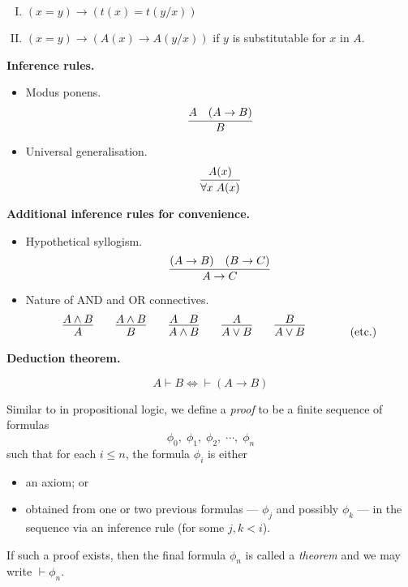 \begin{mdframed}[linewidth=1pt]
\begin{enumerate}[I.]
    \item \((x = y) \rightarrow (t(x) = t(y/x))\)

    \item \((x = y) \rightarrow (A(x) \rightarrow A(y/x))\)\;\; if \(y\) is substitutable for \(x\) in \(A\).
\end{enumerate}

\vspace{1em}
\textbf{Inference rules.}

\begin{itemize}
    \item Modus ponens.
    \[
    \infer{B}{
        A
        &
        (A\rightarrow B)
    }
    \]

    \item Universal generalisation.
    \[\infer{\forall x\; A(x)}{A(x)}\]
\end{itemize}

\vspace{1em}
\textbf{Additional inference rules for convenience.}

\begin{itemize}
    \item Hypothetical syllogism.
    \[\infer{A \rightarrow C}{(A \rightarrow B) & (B \rightarrow C)}\]

    \item Nature of AND and OR connectives.
    \[
        \infer{A}{A \land B}
        \hspace{2em}
        \infer{B}{A \land B}
        \hspace{2em}
        \infer{A\land B}{A & B}
        \hspace{2em}
        \infer{A\lor B}{A}
        \hspace{2em}
        \infer{A\lor B}{B}
        \hspace{2em}
        \tag{etc.}
    \]
\end{itemize}

\vspace{1em}
\textbf{Deduction theorem.}

\[A \vdash B \iff \vdash (A \rightarrow B)\]

\end{mdframed}
\vspace{1em}

Similar to in propositional logic, we define a \emph{proof} to be a finite sequence of formulas
%
\[\phi_0,\; \phi_1,\; \phi_2,\; \cdots,\; \phi_n\]
%
such that for each \(i \leq n\), the formula \(\phi_i\) is either
%
\begin{itemize}
    \item an axiom; or
    \item obtained from one or two previous formulas --- \(\phi_j\) and possibly \(\phi_k\) --- in the sequence via an inference rule (for some \(j, k < i\)).
\end{itemize}
%
If such a proof exists, then the final formula \(\phi_n\) is called a \emph{theorem} and we may write \(\vdash \phi_n\).

